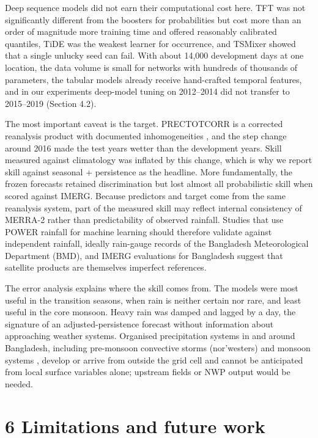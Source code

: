 \documentclass[
]{article}
\begin{document}
Deep sequence models did not earn their computational cost here. TFT was not significantly different from the boosters for probabilities but cost more than an order of magnitude more training time and offered reasonably calibrated quantiles, TiDE was the weakest learner for occurrence, and TSMixer showed that a single unlucky seed can fail. With about 14,000 development days at one location, the data volume is small for networks with hundreds of thousands of parameters, the tabular models already receive hand-crafted temporal features, and in our experiments deep-model tuning on 2012--2014 did not transfer to 2015--2019 (Section 4.2).

The most important caveat is the target. PRECTOTCORR is a corrected reanalysis product with documented inhomogeneities \citep{reichle2017}, and the step change around 2016 made the test years wetter than the development years. Skill measured against climatology was inflated by this change, which is why we report skill against seasonal + persistence as the headline. More fundamentally, the frozen forecasts retained discrimination but lost almost all probabilistic skill when scored against IMERG. Because predictors and target come from the same reanalysis system, part of the measured skill may reflect internal consistency of MERRA-2 rather than predictability of observed rainfall. Studies that use POWER rainfall for machine learning should therefore validate against independent rainfall, ideally rain-gauge records of the Bangladesh Meteorological Department (BMD), and IMERG evaluations for Bangladesh \citep{ahmed2021} suggest that satellite products are themselves imperfect references.

The error analysis explains where the skill comes from. The models were most useful in the transition seasons, when rain is neither certain nor rare, and least useful in the core monsoon. Heavy rain was damped and lagged by a day, the signature of an adjusted-persistence forecast without information about approaching weather systems. Organised precipitation systems in and around Bangladesh, including pre-monsoon convective storms (nor'westers) and monsoon systems \citep{rafiuddin2010}, develop or arrive from outside the grid cell and cannot be anticipated from local surface variables alone; upstream fields or NWP output would be needed.

\hypertarget{limitations-and-future-work}{%
\section{6 Limitations and future work}\label{limitations-and-future-work}}
\end{document}
